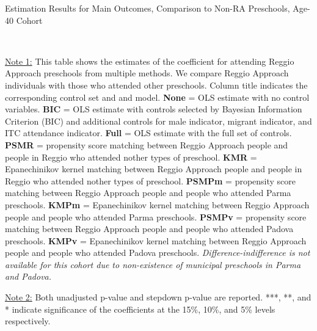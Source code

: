 \begin{table}[H] \caption{Estimation Results for Main Outcomes, Comparison to Non-RA Preschools, Age-40 Cohort} \label{ols-M-adult40-reg-pres}
\scalebox{0.6}{}
\vspace{1ex} \\
\footnotesize\raggedright{\underline{Note 1:} This table shows the estimates of the coefficient for attending Reggio Approach preschools from multiple methods. We compare Reggio Approach individuals with those who attended other preschools. Column title indicates the corresponding control set and and model. \textbf{None} = OLS estimate with no control variables. \textbf{BIC} = OLS estimate with controls selected by Bayesian Information Criterion (BIC) and additional controls for male indicator, migrant indicator, and ITC attendance indicator. \textbf{Full} = OLS estimate with the full set of controls. \textbf{PSMR} =  propensity score matching between Reggio Approach people and people in Reggio who attended nother types of preschool. \textbf{KMR} = Epanechinikov kernel matching between Reggio Approach people and people in Reggio who attended nother types of preschool. \textbf{PSMPm} = propensity score matching between Reggio Approach people and people who attended Parma preschools. \textbf{KMPm} = Epanechinikov kernel matching between Reggio Approach people and people who attended Parma preschools. \textbf{PSMPv} = propensity score matching between Reggio Approach people and people who attended Padova preschools. \textbf{KMPv} = Epanechinikov kernel matching between Reggio Approach people and people who attended Padova preschools. \textit{Difference-indifference is not available for this cohort due to non-existence of municipal preschools in Parma and Padova.}} 

\footnotesize\raggedright{\underline{Note 2:} Both unadjusted p-value and stepdown p-value are reported. ***, **, and * indicate significance of the coefficients at the 15\%, 10\%, and 5\% levels respectively.}
\end{table}

